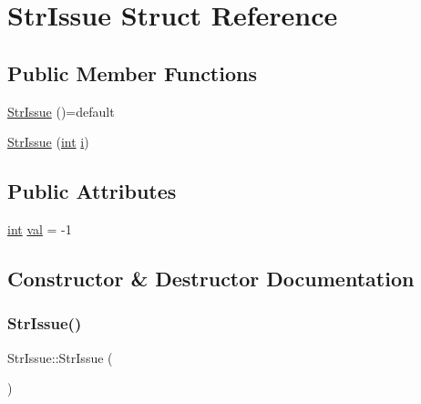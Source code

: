 \hypertarget{struct_str_issue}{}\section{Str\+Issue Struct Reference}
\label{struct_str_issue}
\subsection*{Public Member Functions}
\begin{DoxyCompactItemize}
\item 
\mbox{\hyperlink{struct_str_issue_a5f3a7d307e052b1732f297c199c33603}{Str\+Issue}} ()=default
\item 
\mbox{\hyperlink{struct_str_issue_a59481c3b766f228c859b6e91bb569c8c}{Str\+Issue}} (\mbox{\hyperlink{warnings_8h_a74f207b5aa4ba51c3a2ad59b219a423b}{int}} \mbox{\hyperlink{abstract_8h_a13235ab5ddf5c2ccd5ca35ab01d91328}{i}})
\end{DoxyCompactItemize}
\subsection*{Public Attributes}
\begin{DoxyCompactItemize}
\item 
\mbox{\hyperlink{warnings_8h_a74f207b5aa4ba51c3a2ad59b219a423b}{int}} \mbox{\hyperlink{struct_str_issue_ae8d7bda00d07251eb6c45a7f09e9b6e9}{val}} = -\/1
\end{DoxyCompactItemize}


\subsection{Constructor \& Destructor Documentation}
\mbox{\label{struct_str_issue_a5f3a7d307e052b1732f297c199c33603}} 
\subsubsection{\texorpdfstring{StrIssue()}{StrIssue()}\hspace{0.1cm}{\footnotesize\ttfamily [1/2]}}
{\footnotesize\ttfamily Str\+Issue\+::\+Str\+Issue (\begin{DoxyParamCaption}{ }\end{DoxyParamCaption})\hspace{0.3cm}{\ttfamily [default]}}

